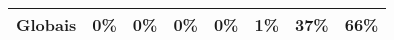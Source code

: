 \begin{table}[]
{\begin{tabular}{l|ccccccc}
            Globais                                                     & 0\%                                                        & 0\%                                                     & 0\%                                                     & 0\%                                                     & \cellcolor[HTML]{FFDFA0}1\%                             & \cellcolor[HTML]{FFDFA0}37\%                            & \cellcolor[HTML]{FFC656}66\%                            \\ \hline
        \end{tabular}%
    }
\end{table}